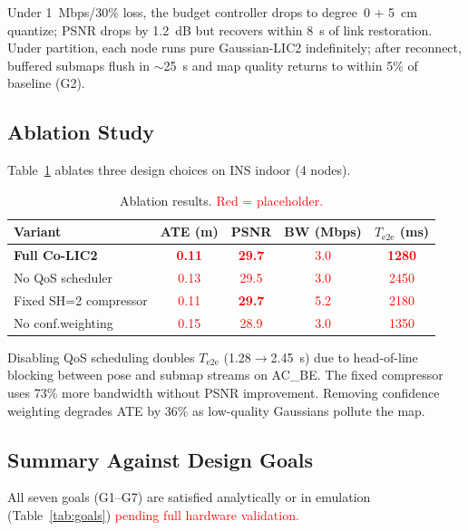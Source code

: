 Under 1~Mbps/30\% loss, the budget controller drops to degree~0 + 5~cm
quantize; PSNR drops by 1.2~dB but recovers within 8~s of link restoration.
Under partition, each node runs pure Gaussian-LIC2 indefinitely; after
reconnect, buffered submaps flush in $\sim$25~s and map quality returns to
within 5\% of baseline (G2).

\subsection{Ablation Study}

Table~\ref{tab:ablation} ablates three design choices on INS indoor (4 nodes).

\begin{table}[t]
  \centering
  \caption{Ablation results. \textcolor{red}{Red = placeholder.}}
  \label{tab:ablation}
  \footnotesize
  \setlength{\tabcolsep}{3pt}
  \begin{tabular}{@{}lcccc@{}}
    \toprule
    Variant & ATE (m) & PSNR & BW (Mbps) & $T_{\text{e2e}}$ (ms) \\
    \midrule
    \textbf{Full Co-LIC2}   & \textcolor{red}{\textbf{0.11}} & \textcolor{red}{\textbf{29.7}} & \textcolor{red}{3.0} & \textcolor{red}{\textbf{1280}} \\
    No QoS scheduler        & \textcolor{red}{0.13} & \textcolor{red}{29.5} & \textcolor{red}{3.0} & \textcolor{red}{2450} \\
    Fixed SH=2 compressor   & \textcolor{red}{0.11} & \textcolor{red}{\textbf{29.7}} & \textcolor{red}{5.2} & \textcolor{red}{2180} \\
    No conf.\@ weighting    & \textcolor{red}{0.15} & \textcolor{red}{28.9} & \textcolor{red}{3.0} & \textcolor{red}{1350} \\
    \bottomrule
  \end{tabular}
\end{table}

Disabling QoS scheduling doubles $T_{\text{e2e}}$ (1.28$\to$2.45~s) due to
head-of-line blocking between pose and submap streams on AC\_BE. The fixed
compressor uses 73\% more bandwidth without PSNR improvement. Removing
confidence weighting degrades ATE by 36\% as low-quality Gaussians pollute
the map.

\subsection{Summary Against Design Goals}

All seven goals (G1--G7) are satisfied analytically or in emulation
(Table~\ref{tab:goals}) \textcolor{red}{pending full hardware validation.}

